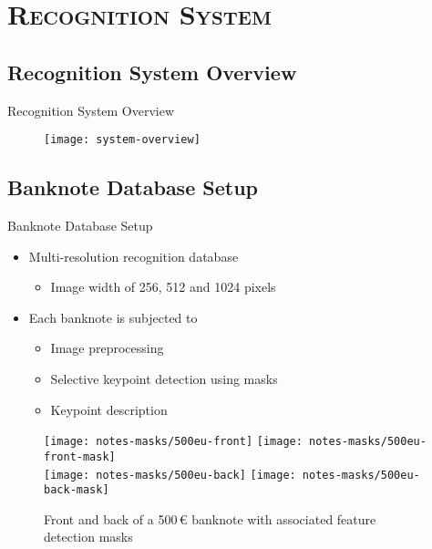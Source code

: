 \section{\scshape Recognition System}\label{sec:methodology}

\subsection{Recognition System Overview}
\begin{frame}{Recognition System Overview}
	\begin{figure}
		\centering
		\texttt{[image: system-overview]}
		\label{fig:system-overview}
	\end{figure}
\end{frame}


\subsection{Banknote Database Setup}
\begin{frame}{Banknote Database Setup}
	\begin{itemize}
		\item Multi-resolution recognition database
		\begin{itemize}
			\item Image width of 256, 512 and 1024 pixels
		\end{itemize}
		
		\item Each banknote is subjected to
		\begin{itemize}
			\item Image preprocessing
			\item Selective keypoint detection using masks
			\item Keypoint description
		\end{itemize}
	\end{itemize}
	
	\begin{figure}[H]
		\centering
		\texttt{[image: notes-masks/500eu-front]}
		\texttt{[image: notes-masks/500eu-front-mask]}\\
		\texttt{[image: notes-masks/500eu-back]}
		\texttt{[image: notes-masks/500eu-back-mask]}
		\caption{Front and back of a 500\,\euro{} banknote with associated feature detection masks}
		\label{fig:banknote-feature-detection-mask-500-front}
	\end{figure}
\end{frame}


